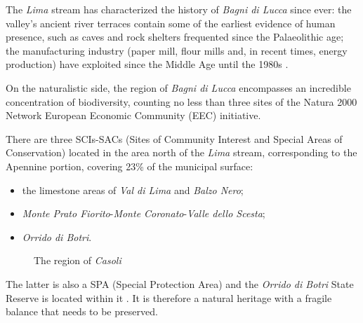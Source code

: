 \documentclass[sustainability,article,submit,pdftex,moreauthors]{Definitions/mdpi}
\begin{document}
The \emph{Lima} stream has characterized the history of \emph{Bagni di Lucca} since ever: the valley's ancient river terraces contain some of the earliest evidence of human presence, such as caves and rock shelters frequented since the Palaeolithic age; the manufacturing industry (paper mill, flour mills and, in recent times, energy production) have exploited since the Middle Age until the 1980s \cite{men76, bed05, ser21}.
 
On the naturalistic side, the region of \emph{Bagni di Lucca} encompasses an incredible concentration of biodiversity, counting no less than three sites of the Natura 2000 Network  European Economic Community (EEC) initiative.

There are three SCIs-SACs (Sites of Community Interest and Special Areas of Conservation) located in the area north of the \emph{Lima} stream, corresponding to the Apennine portion, covering 23\% of the municipal surface:
\begin {itemize}
\item the limestone areas of \emph{Val di Lima} and \emph{Balzo Nero}; 
\item \emph{Monte Prato Fiorito}-\emph{Monte Coronato}-\emph{Valle dello
Scesta}; 
\item \emph{Orrido di Botri}.
\end{itemize}


\begin{figure}
\hfill
{}
\hfill
{}
\caption[The region of \emph{Casoli}]{The region of \emph{Casoli}}
\label{fig:toscana-casoli}
\end{figure}

The latter is also a SPA (Special Protection Area) and the \textit{Orrido di Botri} State Reserve is located within it . It is therefore a natural heritage with a fragile balance that needs to be preserved.
\end{document}

